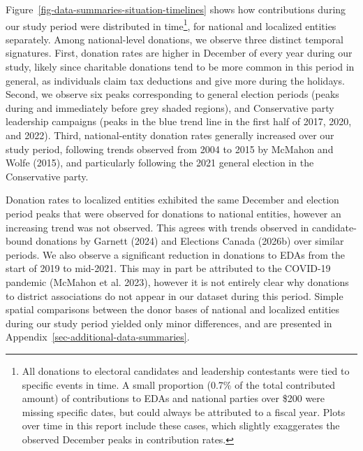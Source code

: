 \documentclass[
  letterpaper,
  DIV=11,
  numbers=noendperiod]{scrartcl}
\begin{document}
Figure~\ref{fig-data-summaries-situation-timelines} shows how
contributions during our study period were distributed in
time\footnote{All donations to electoral candidates and leadership
  contestants were tied to specific events in time. A small proportion
  (0.7\% of the total contributed amount) of contributions to EDAs and
  national parties over \$200 were missing specific dates, but could
  always be attributed to a fiscal year. Plots over time in this report
  include these cases, which slightly exaggerates the observed December
  peaks in contribution rates.}, for national and localized entities
separately. Among national-level donations, we observe three distinct
temporal signatures. First, donation rates are higher in December of
every year during our study, likely since charitable donations tend to
be more common in this period in general, as individuals claim tax
deductions and give more during the holidays. Second, we observe six
peaks corresponding to general election periods (peaks during and
immediately before grey shaded regions), and Conservative party
leadership campaigns (peaks in the blue trend line in the first half of
2017, 2020, and 2022). Third, national-entity donation rates generally
increased over our study period, following trends observed from 2004 to
2015 by McMahon and Wolfe (2015), and particularly following the 2021
general election in the Conservative party.

Donation rates to localized entities exhibited the same December and
election period peaks that were observed for donations to national
entities, however an increasing trend was not observed. This agrees with
trends observed in candidate-bound donations by Garnett (2024) and
Elections Canada (2026b) over similar periods. We also observe a
significant reduction in donations to EDAs from the start of 2019 to
mid-2021. This may in part be attributed to the COVID-19 pandemic
(McMahon et al. 2023), however it is not entirely clear why donations to
district associations do not appear in our dataset during this period.
Simple spatial comparisons between the donor bases of national and
localized entities during our study period yielded only minor
differences, and are presented in
Appendix~\ref{sec-additional-data-summaries}.
\end{document}
